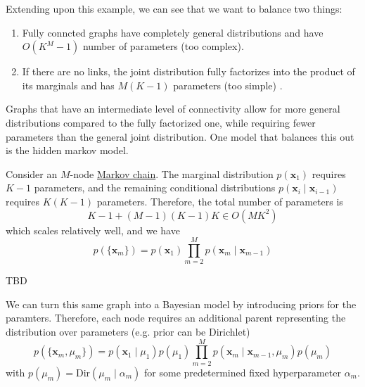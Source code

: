 \documentclass{article}
\begin{document}
  Extending upon this example, we can see that we want to balance two things: 
  \begin{enumerate} 
    \item Fully conncted graphs have completely general distributions and have $O(K^M -1)$ number of parameters (too complex). 
    \item If there are no links, the joint distribution fully factorizes into the product of its marginals and has $M(K-1)$ parameters (too simple) . 
  \end{enumerate}
  Graphs that have an intermediate level of connectivity allow for more general distributions compared to the fully factorized one, while requiring fewer parameters than the general joint distribution. One model that balances this out is the hidden markov model. 

  \begin{example}
    \label{ex:chain-graph}
    Consider an $M$-node \hyperref[sp-def:markov-chain]{Markov chain}. The marginal distribution $p(\mathbf{x}_1)$ requires $K-1$ parameters, and the remaining conditional distributions $p(\mathbf{x}_i \mid \mathbf{x}_{i-1})$ requires $K(K-1)$ parameters. Therefore, the total number of parameters is 
    \begin{equation}
      K-1 + (M-1) (K-1) K \in O(M K^2)
    \end{equation}
    which scales relatively well, and we have 
    \begin{equation}
      p(\{\mathbf{x}_m\}) = p (\mathbf{x}_1) \prod_{m=2}^M p(\mathbf{x}_m \mid \mathbf{x}_{m-1})
    \end{equation}
    \begin{center}
      TBD
    \end{center}
    We can turn this same graph into a Bayesian model by introducing priors for the paramters. Therefore, each node requires an additional parent representing the distribution over parameters (e.g. prior can be Dirichlet)  
    \begin{equation}
      p(\{\mathbf{x}_m , \mu_m\}) = p(\mathbf{x}_1 \mid \mu_1) p(\mu_1) \prod_{m=2}^M p(\mathbf{x}_m \mid \mathbf{x}_{m-1}, \mu_m) p(\mu_m)
    \end{equation}
    with $p(\mu_m) = \mathrm{Dir}(\mu_m \mid \alpha_m)$ for some predetermined fixed hyperparameter $\alpha_m$. 

    \begin{figure}[H]
      \centering 
\end{figure}
\end{example}
\end{document}
